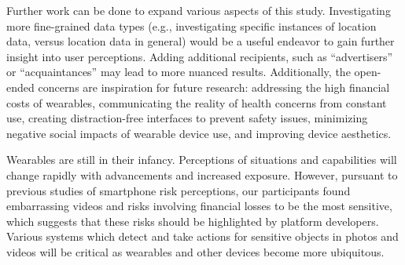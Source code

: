 Further work can be done to expand various aspects of this study. Investigating more fine-grained data types (e.g., investigating specific instances of location data, versus location data in general) would be a useful endeavor to gain further insight into user perceptions. Adding additional recipients, such as ``advertisers'' or ``acquaintances'' may lead to more nuanced results. Additionally, the open-ended concerns are inspiration for future research: addressing the high financial costs of wearables, communicating the reality of health concerns from constant use, creating distraction-free interfaces to prevent safety issues, minimizing negative social impacts of wearable device use, and improving device aesthetics.  

Wearables are still in their infancy. Perceptions of situations and capabilities will change rapidly with advancements and increased exposure. However, pursuant to previous studies of smartphone risk perceptions, our participants found embarrassing videos and risks involving financial losses to be the most sensitive, which suggests that these risks should be highlighted by platform developers. Various systems which detect and take actions for sensitive objects in photos and videos will be critical as wearables and other devices become more ubiquitous.
